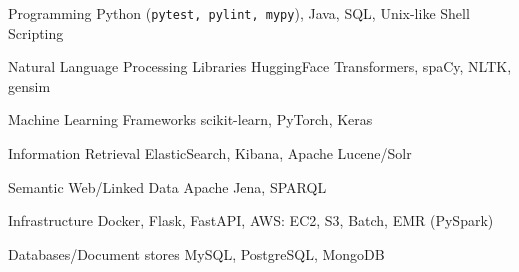 

\begin{cvskills}

  \cvskill
    {Programming} %
    {Python (\texttt{pytest, pylint, mypy}), Java, SQL, Unix-like Shell Scripting} %

  \cvskill
    {Natural Language Processing Libraries} %
    {HuggingFace Transformers, spaCy, NLTK, gensim} %

  \cvskill
    {Machine Learning Frameworks} %
    {scikit-learn, PyTorch, Keras} %

  \cvskill
    {Information Retrieval} %
    {ElasticSearch, Kibana, Apache Lucene/Solr} %

  \cvskill
    {Semantic Web/Linked Data} %
    {Apache Jena, SPARQL} %

  \cvskill
    {Infrastructure} %
    {Docker, Flask, FastAPI, AWS: EC2, S3, Batch, EMR (PySpark)} %

  \cvskill
    {Databases/Document stores} %
    {MySQL, PostgreSQL, MongoDB} %

\end{cvskills}

